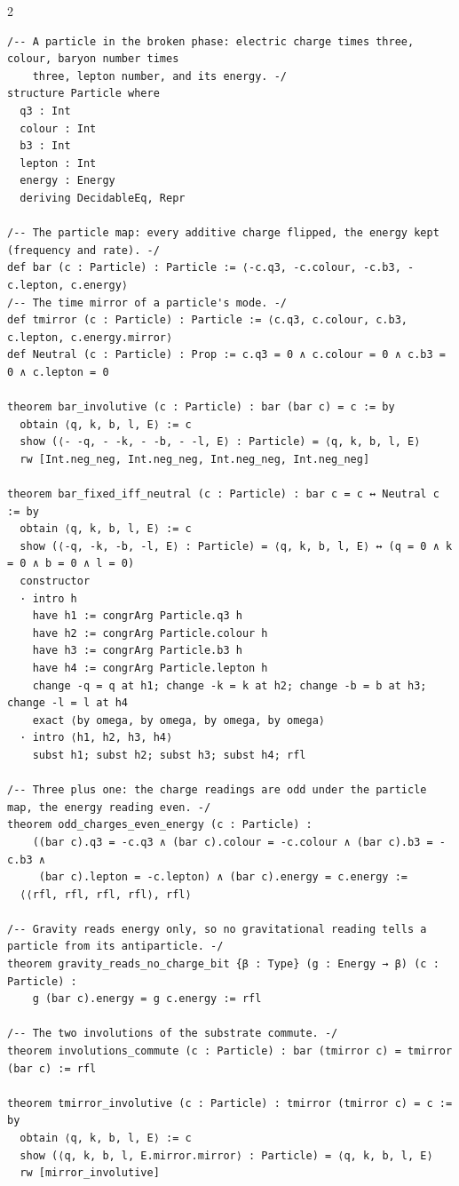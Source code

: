 \documentclass[10pt]{article}
\begin{document}
\begin{multicols}{2}
\begin{Verbatim}[fontsize=\fontsize{5.9}{6.8}\selectfont,breaklines,breakanywhere,breaksymbolleft={}]
/-- A particle in the broken phase: electric charge times three, colour, baryon number times
    three, lepton number, and its energy. -/
structure Particle where
  q3 : Int
  colour : Int
  b3 : Int
  lepton : Int
  energy : Energy
  deriving DecidableEq, Repr

/-- The particle map: every additive charge flipped, the energy kept (frequency and rate). -/
def bar (c : Particle) : Particle := ⟨-c.q3, -c.colour, -c.b3, -c.lepton, c.energy⟩
/-- The time mirror of a particle's mode. -/
def tmirror (c : Particle) : Particle := ⟨c.q3, c.colour, c.b3, c.lepton, c.energy.mirror⟩
def Neutral (c : Particle) : Prop := c.q3 = 0 ∧ c.colour = 0 ∧ c.b3 = 0 ∧ c.lepton = 0

theorem bar_involutive (c : Particle) : bar (bar c) = c := by
  obtain ⟨q, k, b, l, E⟩ := c
  show (⟨- -q, - -k, - -b, - -l, E⟩ : Particle) = ⟨q, k, b, l, E⟩
  rw [Int.neg_neg, Int.neg_neg, Int.neg_neg, Int.neg_neg]

theorem bar_fixed_iff_neutral (c : Particle) : bar c = c ↔ Neutral c := by
  obtain ⟨q, k, b, l, E⟩ := c
  show (⟨-q, -k, -b, -l, E⟩ : Particle) = ⟨q, k, b, l, E⟩ ↔ (q = 0 ∧ k = 0 ∧ b = 0 ∧ l = 0)
  constructor
  · intro h
    have h1 := congrArg Particle.q3 h
    have h2 := congrArg Particle.colour h
    have h3 := congrArg Particle.b3 h
    have h4 := congrArg Particle.lepton h
    change -q = q at h1; change -k = k at h2; change -b = b at h3; change -l = l at h4
    exact ⟨by omega, by omega, by omega, by omega⟩
  · intro ⟨h1, h2, h3, h4⟩
    subst h1; subst h2; subst h3; subst h4; rfl

/-- Three plus one: the charge readings are odd under the particle map, the energy reading even. -/
theorem odd_charges_even_energy (c : Particle) :
    ((bar c).q3 = -c.q3 ∧ (bar c).colour = -c.colour ∧ (bar c).b3 = -c.b3 ∧
     (bar c).lepton = -c.lepton) ∧ (bar c).energy = c.energy :=
  ⟨⟨rfl, rfl, rfl, rfl⟩, rfl⟩

/-- Gravity reads energy only, so no gravitational reading tells a particle from its antiparticle. -/
theorem gravity_reads_no_charge_bit {β : Type} (g : Energy → β) (c : Particle) :
    g (bar c).energy = g c.energy := rfl

/-- The two involutions of the substrate commute. -/
theorem involutions_commute (c : Particle) : bar (tmirror c) = tmirror (bar c) := rfl

theorem tmirror_involutive (c : Particle) : tmirror (tmirror c) = c := by
  obtain ⟨q, k, b, l, E⟩ := c
  show (⟨q, k, b, l, E.mirror.mirror⟩ : Particle) = ⟨q, k, b, l, E⟩
  rw [mirror_involutive]


\end{Verbatim}
\end{multicols}
\end{document}
